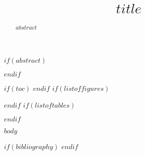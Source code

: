 \documentclass[twoside]{mitthesis}
\title{$title$}
\begin{document}
\maketitle

$if(abstract)$
\begin{abstract}
$abstract$
\end{abstract}
$endif$

$if(toc)$
  \tableofcontents
$endif$
$if(listoffigures)$
  \listoffigures
$endif$
$if(listoftables)$
  \listoftables
$endif$

$body$

$if(bibliography)$
\printbibliography
$endif$
\end{document}
